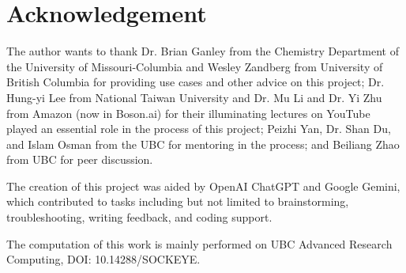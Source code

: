 \documentclass{article}
\begin{document}
\section*{Acknowledgement}
The author wants to thank Dr. Brian Ganley from the Chemistry Department of the University of Missouri-Columbia and Wesley Zandberg from University of British Columbia for providing use cases and other advice on this project; Dr. Hung-yi Lee from National Taiwan University and Dr. Mu Li and Dr. Yi Zhu from Amazon (now in Boson.ai) for their illuminating lectures on YouTube played an essential role in the process of this project; Peizhi Yan, Dr. Shan Du, and Islam Osman from the UBC for mentoring in the process; and Beiliang Zhao from UBC for peer discussion.


The creation of this project was aided by OpenAI ChatGPT and Google Gemini, which contributed to tasks including but not limited to brainstorming, troubleshooting, writing feedback, and coding support.

The computation of this work is mainly performed on UBC Advanced Research Computing, DOI: 10.14288/SOCKEYE.

\printbibliography
\end{document}
